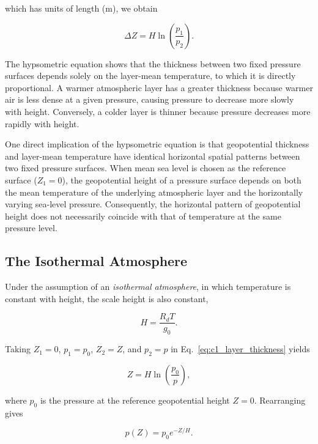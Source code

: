 \documentclass[10pt,twocolumn]{memoir}
\begin{document}
which has units of length (m), we obtain

\begin{equation}
    \Delta Z=H\ln\left(\frac{p_1}{p_2}\right).
\label{eq:c1_layer_thickness}
\end{equation}

The hypsometric equation shows that the thickness between two fixed pressure surfaces depends solely on the layer-mean temperature, to which it is directly proportional. A warmer atmospheric layer has a greater thickness because warmer air is less dense at a given pressure, causing pressure to decrease more slowly with height. Conversely, a colder layer is thinner because pressure decreases more rapidly with height.

One direct implication of the hypsometric equation is that geopotential thickness and layer-mean temperature have identical horizontal spatial patterns between two fixed pressure surfaces. When mean sea level is chosen as the reference surface ($Z_1=0$), the geopotential height of a pressure surface depends on both the mean temperature of the underlying atmospheric layer and the horizontally varying sea-level pressure. Consequently, the horizontal pattern of geopotential height does not necessarily coincide with that of temperature at the same pressure level.

\subsection{The Isothermal Atmosphere}

Under the assumption of an \textit{isothermal atmosphere}, in which temperature is constant with height, the scale height is also constant,

\begin{equation}
    H=\frac{R_dT}{g_0}.
\end{equation}

Taking $Z_1=0$, $p_1=p_0$, $Z_2=Z$, and $p_2=p$ in Eq.~\ref{eq:c1_layer_thickness} yields

\begin{equation}
    Z=H\ln\left(\frac{p_0}{p}\right),
\end{equation}

where $p_0$ is the pressure at the reference geopotential height $Z=0$. Rearranging gives

\begin{equation}
    p(Z)=p_0e^{-Z/H}.
    \label{eq:c1_isothermal_pressure}
\end{equation}
\end{document}
